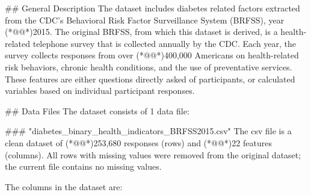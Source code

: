 \documentclass[11pt]{article}
\begin{document}
\begin{codeoutput}
## General Description
The dataset includes diabetes related factors extracted from the CDC's Behavioral Risk Factor Surveillance System (BRFSS), year (*@@*)2015.
The original BRFSS, from which this dataset is derived, is a health-related telephone survey that is collected annually by the CDC.
Each year, the survey collects responses from over (*@@*)400,000 Americans on health-related risk behaviors, chronic health conditions, and the use of preventative services. These features are either questions directly asked of participants, or calculated variables based on individual participant responses.

## Data Files
The dataset consists of 1 data file:

### "diabetes_binary_health_indicators_BRFSS2015.csv"
The csv file is a clean dataset of (*@@*)253,680 responses (rows) and (*@@*)22 features (columns).
All rows with missing values were removed from the original dataset; the current file contains no missing values.

The columns in the dataset are:


\end{codeoutput}
\end{document}
